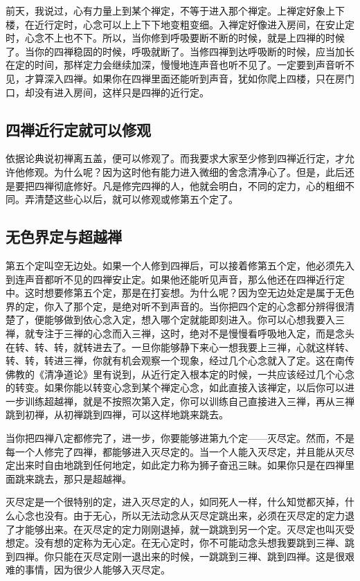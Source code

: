 \documentclass{book}
\begin{document}
前天，我说过，心有力量上到某个禅定，不等于进入那个禅定。上禅定好象上下楼，在近行定时，心念可以上上下下地变粗变细。入禅定好像进入房间，在安止定时，心念不上也不下。所以，当你修到呼吸要断不断的时候，就是上四禅的时候了。当你的四禅稳固的时候，呼吸就断了。当修四禅到达呼吸断的时候，应当加长在定的时间，那样定力会继续加深，慢慢地连声音也听不见了。一定要到声音听不见，才算深入四禅。如果你在四禅里面还能听到声音，犹如你爬上四楼，只在房门口，却没有进入房间，这样只是四禅的近行定。

\subsection{四禅近行定就可以修观}

依据论典说初禅离五盖，便可以修观了。而我要求大家至少修到四禅近行定，才允许他修观。为什么呢？因为这时他有能力进入微细的舍念清净心了。但是，此后还是要把四禅彻底修好。凡是修完四禅的人，他就会明白，不同的定力，心的粗细不同。弄清楚这些心以后，就可以修观或修第五个定了。

\subsection{无色界定与超越禅}

第五个定叫空无边处。如果一个人修到四禅后，可以接着修第五个定，他必须先入到连声音都听不见的四禅安止定。如果他还能听见声音，那么他还在四禅近行定中。这时想要修第五个定，那是在打妄想。为什么呢？因为空无边处定是属于无色界的定，你入了那个定，是绝对听不到声音的。当你把四个定的心念都分辨得很清楚了，便能够做到依心念入定，想入哪个定就能即刻进入。你可以心想我要入三禅，就专注于三禅的心念而入三禅，这时，绝对不是慢慢看呼吸地入定，而是念头在转、转、转，就转进去了。一旦你能够静下来心一想我要上三禅，心就这样转、转、转，转进三禅，你就有机会观察一个现象，经过几个心念就入了定。这在南传佛教的《清净道论》里有说到，从近行定入根本定的时候，一共应该经过几个心念的转变。如果你能以转变心念到某个禅定心念，如此直接入该禅定，以后你可以进一步训练超越禅，就是不按照次第入定，你可以训练自己直接进入三禅，再从三禅跳到初禅，从初禅跳到四禅，可以这样地跳来跳去。

当你把四禅八定都修完了，进一步，你要能够进第九个定——灭尽定。然而，不是每一个人修完了四禅，都能够进入灭尽定的。当一个人能入灭尽定，并且能从灭尽定出来时自由地跳到任何地定，如此定力称为狮子奋迅三昧。如果你只是在四禅里面跳来跳去，那只是超越禅。

灭尽定是一个很特别的定，进入灭尽定的人，如同死人一样，什么知觉都灭掉，什么心念也没有。由于无心，所以无法动念从灭尽定跳出来，必须在灭尽定的定力退了才能够出来。在灭尽定的定力刚刚退掉，就一跳跳到另一个定。灭尽定也叫灭受想定。没有想的定称为无心定。在无心定时，你不可能动念头想我要跳到三禅、跳到四禅。你只能在灭尽定刚一退出来的时候，一跳跳到三禅、跳到四禅。这是很艰难的事情，因为很少人能够入灭尽定。
\end{document}
